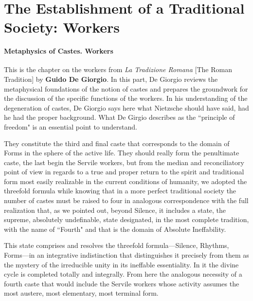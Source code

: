 \section{The Establishment of a Traditional Society: Workers}

\paragraph{Metaphysics of Castes. Workers}
\begin{quotex}
This is the chapter on the workers from \textit{La Tradizione Romana} [The Roman Tradition] by \textbf{Guido De Giorgio}. In this part, De Giorgio reviews the metaphysical foundations of the notion of castes and prepares the groundwork for the discussion of the specific functions of the workers. In his understanding of the degeneration of castes, De Giorgio says here what Nietzsche should have said, had he had the proper background. What De Girgio describes as the ``principle of freedom" is an essential point to understand. 

\end{quotex}

They constitute the third and final caste that corresponds to the domain of Forms in the sphere of the active life. They should really form the penultimate caste, the last begin the Servile workers, but from the median and reconciliatory point of view in regards to a true and proper return to the spirit and traditional form most easily realizable in the current conditions of humanity, we adopted the threefold formula while knowing that in a more perfect traditional society the number of castes must be raised to four in analogous correspondence with the full realization that, as we pointed out, beyond Silence, it includes a state, the supreme, absolutely undefinable, state designated, in the most complete tradition, with the name of ``Fourth" and that is the domain of Absolute Ineffability.

This state comprises and resolves the threefold formula—Silence, Rhythms, Forms—in an integrative indistinction that distinguishes it precisely from them as the mystery of the irreducible unity in its ineffable essentiality. In it the divine cycle is completed totally and integrally. From here the analogous necessity of a fourth caste that would include the Servile workers whose activity assumes the most austere, most elementary, most terminal form.

